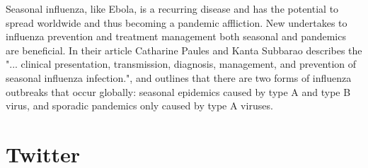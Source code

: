 Seasonal influenza, like Ebola, is a recurring disease and has the potential to spread worldwide and thus becoming a pandemic affliction. New undertakes to influenza prevention and treatment management both seasonal and pandemics are beneficial. In their article Catharine Paules and Kanta Subbarao \cite{article_Paules} describes the "... clinical presentation, transmission, diagnosis, management, and prevention of seasonal influenza infection.", and outlines that there are two forms of influenza outbreaks that occur globally: seasonal epidemics caused by type A and type B virus, and sporadic pandemics only caused by type A viruses. 






\section{Twitter}
